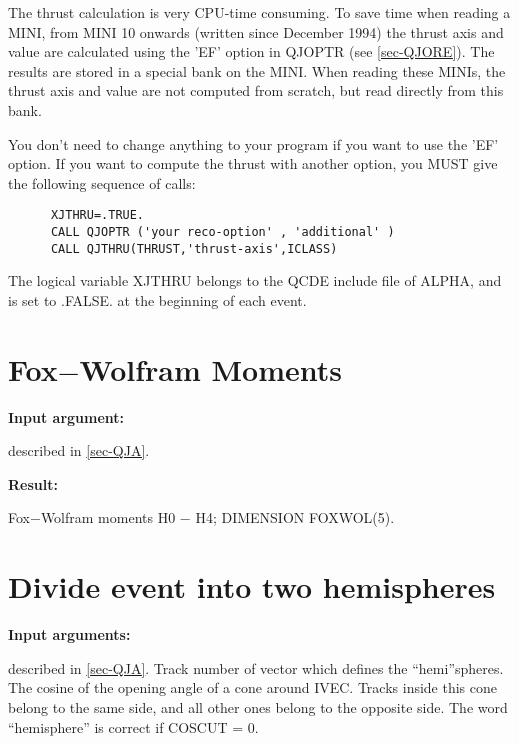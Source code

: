   The thrust calculation is very CPU-time consuming. To save time when reading a MINI,
 from MINI 10 onwards (written since December 1994)
 the thrust axis and value are calculated using the 'EF' option in QJOPTR (see \ref{sec-QJORE}). The results
 are stored in a special bank on the MINI.
 When reading these MINIs, the thrust axis and value are not computed from scratch, but
 read directly from this bank.
 
 You don't need to change anything to your program if you want to use
 the 'EF' option.
 If you want to compute the thrust with another option, you MUST give
 the following sequence of calls:
\begin{verbatim}
      XJTHRU=.TRUE.
      CALL QJOPTR ('your reco-option' , 'additional' )
      CALL QJTHRU(THRUST,'thrust-axis',ICLASS)
\end{verbatim}
 
 The logical variable XJTHRU belongs to the QCDE include file of ALPHA, and is set to .FALSE. at the
 beginning of each event.
 
\section{\label{sec-QJFW}Fox$-$Wolfram Moments}
\par
{}
\par
\par
{\bf Input argument:}
\begin{indentlist}{ 3.00cm}{ 3.25cm}
described in \ref{sec-QJA}.
\end{indentlist}
 
{\bf Result:}
\begin{indentlist}{ 3.00cm}{ 3.25cm}
Fox$-$Wolfram moments H0 $-$ H4;
DIMENSION FOXWOL(5).
\end{indentlist}
 
\section{\label{sec-QJHE}Divide event into two hemispheres}
\par
{}
\par
\par
{\bf Input arguments:}
\begin{indentlist}{ 3.00cm}{ 3.25cm}
described in \ref{sec-QJA}.
Track number of vector which defines the ``hemi''spheres.
The cosine of the opening angle of a cone around
IVEC.
Tracks inside this cone belong to the same side, and all other
ones belong to the opposite side. The word ``hemisphere'' is correct
if COSCUT = 0.
\end{indentlist}
 
